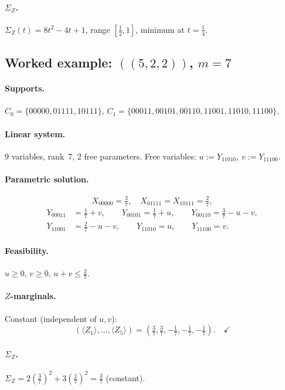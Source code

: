\documentclass{article}
\newcommand{\SigZ}{\Sigma_Z}
\begin{document}
\paragraph{$\SigZ$.}
$\SigZ(t)=8t^2-4t+1$, range $[\tfrac12,1]$, minimum at $t=\tfrac14$. \checkmark

\subsection{Worked example: $((5,2,2))$, $m=7$}

\paragraph{Supports.}
$C_0=\{00000, 01111, 10111\}$,\quad
$C_1=\{00011, 00101, 00110, 11001, 11010, 11100\}$.

\paragraph{Linear system.}
9 variables, rank~7, 2 free parameters.
Free variables: $u:=Y_{11010}$, $v:=Y_{11100}$.

\paragraph{Parametric solution.}
\[
X_{00000}=\tfrac{3}{7},\quad X_{01111}=X_{10111}=\tfrac{2}{7},
\]
\[
\begin{aligned}
Y_{00011}&=\tfrac{1}{7}+v,\qquad
Y_{00101}=\tfrac{1}{7}+u,\qquad
Y_{00110}=\tfrac{3}{7}-u-v,\\
Y_{11001}&=\tfrac{2}{7}-u-v,\qquad
Y_{11010}=u,\qquad
Y_{11100}=v.
\end{aligned}
\]

\paragraph{Feasibility.} $u\ge 0$, $v\ge 0$, $u+v\le\frac{2}{7}$. \checkmark

\paragraph{$Z$-marginals.}
Constant (independent of $u,v$):
\[
(\langle Z_1\rangle,\dots,\langle Z_5\rangle)
= \left(\tfrac{3}{7}, \tfrac{3}{7}, {-}\tfrac{1}{7}, {-}\tfrac{1}{7}, {-}\tfrac{1}{7}\right). \quad\checkmark
\]

\paragraph{$\SigZ$.}
$\SigZ = 2(\tfrac{3}{7})^2+3(\tfrac{1}{7})^2 = \tfrac{3}{7}$ (constant). \checkmark
\end{document}
